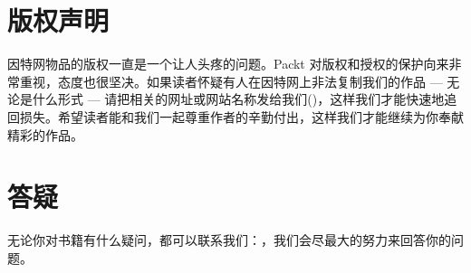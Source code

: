 \section*{版权声明}
\label{sec:piracy}

因特网物品的版权一直是一个让人头疼的问题。Packt 对版权和授权的保护向来非常重视，态度也很坚决。如果读者怀疑有人在因特网上非法复制我们的作品 --- 无论是什么形式 --- 请把相关的网址或网站名称发给我们()，这样我们才能快速地追回损失。希望读者能和我们一起尊重作者的辛勤付出，这样我们才能继续为你奉献精彩的作品。\\

\section*{答疑}
\label{sec:questions}
无论你对书籍有什么疑问，都可以联系我们：，我们会尽最大的努力来回答你的问题。\\